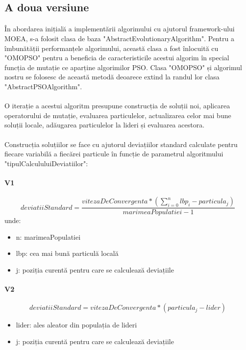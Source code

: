 \subsection{A doua versiune}
\paragraph{}
În abordarea inițială a implementării algorimului cu ajutorul framework-ului MOEA, s-a folosit clasa de baza "AbstractEvolutionaryAlgorithm". Pentru a îmbunătății performanțele algorimului, această clasa a fost înlocuită cu "OMOPSO" pentru a beneficia de caracteristicile acestui algorim în special funcția de mutație ce aparține algorimilor PSO. Clasa "OMOPSO" și algorimul nostru se folosesc de această metodă deoarece extind la randul lor clasa "AbstractPSOAlgorithm".
\paragraph{}
O iterație a acestui algoritm presupune construcția de soluții noi, aplicarea operatorului de mutație, evaluarea particulelor, actualizarea celor mai bune soluții locale, adăugarea particulelor la lideri și evaluarea acestora.
\paragraph{}
Construcția soluțiilor se face cu ajutorul deviațiilor standard calculate pentru fiecare variabilă a fiecărei particule în funcție de parametrul algoritmului "tipulCalcululuiDeviatiilor":
\paragraph{V1}
\begin{equation}
    deviatiiStandard = \frac{vitezaDeConvergenta * (\sum_{i=0}^{n} lbp_i - particula_j)}{marimeaPopulatiei - 1}
\end{equation}
unde:
\begin{itemize}
    \item n: marimeaPopulatiei
    \item lbp: cea mai bună particulă locală
    \item j: poziția curentă pentru care se calculează deviațiile
\end{itemize}
\paragraph{V2}
\begin{equation}
    deviatiiStandard = vitezaDeConvergenta * (particula_j - lider)
\end{equation}
\begin{itemize}
    \item lider: ales aleator din populația de lideri
    \item j: poziția curentă pentru care se calculează deviațiile
\end{itemize}
